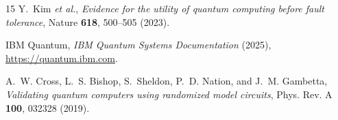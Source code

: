 \documentclass[twocolumn,preprintnumbers,amsmath,amssymb,prl]{revtex4-2}
\begin{document}
\begin{thebibliography}{15}
Y.~Kim \textit{et al.},
\textit{Evidence for the utility of quantum computing before fault tolerance},
Nature \textbf{618}, 500--505 (2023).

IBM Quantum,
\textit{IBM Quantum Systems Documentation} (2025),
\url{https://quantum.ibm.com}.

A.~W. Cross, L.~S. Bishop, S.~Sheldon, P.~D. Nation, and J.~M. Gambetta,
\textit{Validating quantum computers using randomized model circuits},
Phys. Rev. A \textbf{100}, 032328 (2019).

\end{thebibliography}
\end{document}
